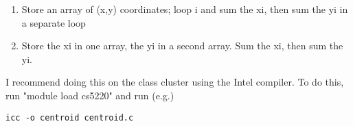 \documentclass{5220hw}
\begin{document}
\begin{exercises}
\begin{enumerate}
    \item Store an array of (x,y) coordinates; loop i and sum the xi, then sum the yi in a separate loop

    \item Store the xi in one array, the yi in a second array. Sum the xi, then sum the yi.
\end{enumerate}

    I recommend doing this on the class cluster using the Intel compiler.  To do this, run "module load cs5220" and run (e.g.)
\begin{lstlisting}
icc -o centroid centroid.c
\end{lstlisting}

\end{exercises}
\end{document}
